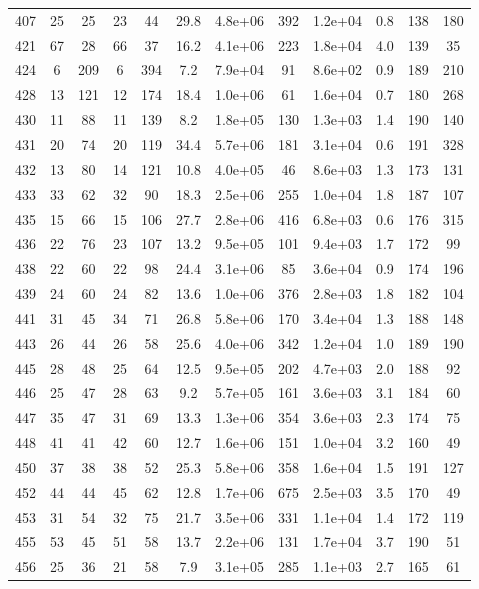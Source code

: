 \begin{table}
\begin{tabular}{cccccccccccc}
407 & 25 & 25 & 23 & 44 & 29.8 & 4.8e+06 & 392 & 1.2e+04 & 0.8 & 138 & 180 \\
421 & 67 & 28 & 66 & 37 & 16.2 & 4.1e+06 & 223 & 1.8e+04 & 4.0 & 139 & 35 \\
424 & 6 & 209 & 6 & 394 & 7.2 & 7.9e+04 & 91 & 8.6e+02 & 0.9 & 189 & 210 \\
428 & 13 & 121 & 12 & 174 & 18.4 & 1.0e+06 & 61 & 1.6e+04 & 0.7 & 180 & 268 \\
430 & 11 & 88 & 11 & 139 & 8.2 & 1.8e+05 & 130 & 1.3e+03 & 1.4 & 190 & 140 \\
431 & 20 & 74 & 20 & 119 & 34.4 & 5.7e+06 & 181 & 3.1e+04 & 0.6 & 191 & 328 \\
432 & 13 & 80 & 14 & 121 & 10.8 & 4.0e+05 & 46 & 8.6e+03 & 1.3 & 173 & 131 \\
433 & 33 & 62 & 32 & 90 & 18.3 & 2.5e+06 & 255 & 1.0e+04 & 1.8 & 187 & 107 \\
435 & 15 & 66 & 15 & 106 & 27.7 & 2.8e+06 & 416 & 6.8e+03 & 0.6 & 176 & 315 \\
436 & 22 & 76 & 23 & 107 & 13.2 & 9.5e+05 & 101 & 9.4e+03 & 1.7 & 172 & 99 \\
438 & 22 & 60 & 22 & 98 & 24.4 & 3.1e+06 & 85 & 3.6e+04 & 0.9 & 174 & 196 \\
439 & 24 & 60 & 24 & 82 & 13.6 & 1.0e+06 & 376 & 2.8e+03 & 1.8 & 182 & 104 \\
441 & 31 & 45 & 34 & 71 & 26.8 & 5.8e+06 & 170 & 3.4e+04 & 1.3 & 188 & 148 \\
443 & 26 & 44 & 26 & 58 & 25.6 & 4.0e+06 & 342 & 1.2e+04 & 1.0 & 189 & 190 \\
445 & 28 & 48 & 25 & 64 & 12.5 & 9.5e+05 & 202 & 4.7e+03 & 2.0 & 188 & 92 \\
446 & 25 & 47 & 28 & 63 & 9.2 & 5.7e+05 & 161 & 3.6e+03 & 3.1 & 184 & 60 \\
447 & 35 & 47 & 31 & 69 & 13.3 & 1.3e+06 & 354 & 3.6e+03 & 2.3 & 174 & 75 \\
448 & 41 & 41 & 42 & 60 & 12.7 & 1.6e+06 & 151 & 1.0e+04 & 3.2 & 160 & 49 \\
450 & 37 & 38 & 38 & 52 & 25.3 & 5.8e+06 & 358 & 1.6e+04 & 1.5 & 191 & 127 \\
452 & 44 & 44 & 45 & 62 & 12.8 & 1.7e+06 & 675 & 2.5e+03 & 3.5 & 170 & 49 \\
453 & 31 & 54 & 32 & 75 & 21.7 & 3.5e+06 & 331 & 1.1e+04 & 1.4 & 172 & 119 \\
455 & 53 & 45 & 51 & 58 & 13.7 & 2.2e+06 & 131 & 1.7e+04 & 3.7 & 190 & 51 \\
456 & 25 & 36 & 21 & 58 & 7.9 & 3.1e+05 & 285 & 1.1e+03 & 2.7 & 165 & 61 \\

\end{tabular}
\end{table}
